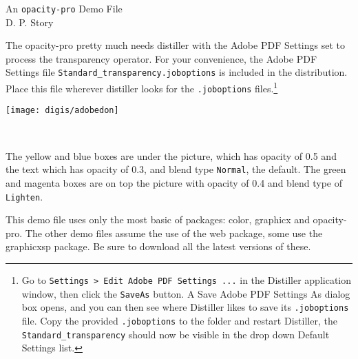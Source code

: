\documentclass{article}
\begin{document}
\begin{center}\large
  An \texttt{opacity-pro} Demo File\\[3pt]D. P. Story
\end{center}

The \textsf{opacity-pro} pretty much needs distiller with
the \textsf{Adobe PDF Settings} set to process the transparency
operator. For your convenience, the \textsf{Adobe PDF Settings} file
\texttt{Standard\_transparency.joboptions} is included in the
distribution. Place this file wherever distiller looks for the
\texttt{.joboptions} files.\footnote{Go to \texttt{Settings > Edit
Adobe PDF Settings ...} in the Distiller application window, then
click the \texttt{SaveAs} button. A \textsf{Save Adobe PDF Settings
As} dialog box opens, and you can then see where Distiller likes to
save its \texttt{.joboptions} file. Copy the provided
\texttt{.joboptions} to the folder and restart Distiller, the
\texttt{Standard\_transparency} should now be visible in the drop
down \textsf{Default Settings} list.}

\bigskip

%
\hspace{1in}
\begin{center}\sffamily\Huge\bfseries
\begin{settransparency}{.5}{.5}\relax
  \texttt{[image: digis/adobedon]}
\end{settransparency}\\[3pt]
\end{center}
\begin{settransparency}[Lighten]{.4}{.4}
%
\hspace{1in}
\end{settransparency}

\vspace{30pt}\noindent
The yellow and blue boxes are under the picture, which has opacity
of 0.5 and the text which has opacity of 0.3, and blend type
\texttt{Normal}, the default. The green and magenta boxes are on top
the picture with opacity of 0.4 and blend type of \texttt{Lighten}.


\bigskip\noindent
This demo file uses only the most basic of packages: \textsf{color},
\textsf{graphicx} and \textsf{opacity-pro}. The other demo files
assume the use of the \textsf{web} package, some use the
\textsf{graphicxsp} package. Be sure to download all the latest
versions of these.
\end{document}
